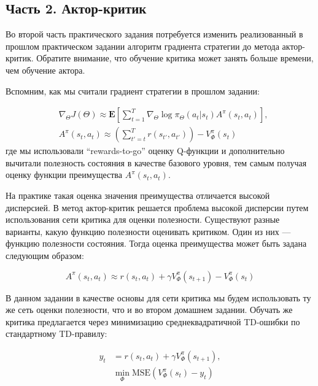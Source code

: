 \documentclass[12pt, oneside]{article}
\begin{document}
\subsection{Часть 2. Актор-критик}

Во второй часть практического задания потребуется изменить реализованный в прошлом практическом задании алгоритм градиента стратегии до метода актор-критик. Обратите внимание, что обучение критика может занять больше времени, чем обучение актора.

Вспомним, как мы считали градиент стратегии в прошлом задании:

\begin{align}
    &\nabla_{\Theta} J(\Theta) \approx \mathbf{E} \left[ \sum_{t=1}^T \nabla_{\Theta} \log \pi_{\Theta} (a_t | s_t) A^{\pi}(s_t, a_t) \right], \\
    &A^{\pi}(s_t, a_t) \approx \left( \sum_{t'=t}^T r(s_{t'}, a_{t'}) \right) - V_{\Phi}^{\pi}(s_t)
\end{align}
\noindent
где мы использовали ``rewards-to-go'' оценку Q-функции и дополнительно вычитали полезность состояния в качестве базового уровня, тем самым получая оценку функции преимущества $A^{\pi}(s_t, a_t)$.

На практике такая оценка значения преимущества отличается высокой дисперсией. В метод актор-критик решается проблема высокой дисперсии путем использования сети критика для оценки полезности. Существуют разные варианты, какую функцию полезности оценивать критиком. Один из них --- функцию полезности состояния. Тогда оценка преимущества может быть задана следующим образом:

\begin{equation}
    A^{\pi}(s_t, a_t) \approx r(s_t, a_t) + \gamma V_{\Phi}^{\pi}(s_{t+1}) - V_{\Phi}^{\pi}(s_t)
\end{equation}

В данном задании в качестве основы для сети критика мы будем использовать ту же сеть оценки полезности, что и во втором домашнем задании. Обучать же критика предлагается через минимизацию среднеквадратичной TD-ошибки по стандартному TD-правилу:

\begin{align}
    y_t &= r(s_t, a_t) + \gamma V_{\Phi}^{\pi}(s_{t+1}), \\
    &\min_{\Phi} \text{MSE} (V_{\Phi}^{\pi}(s_t) - y_t)
\end{align}
\end{document}
